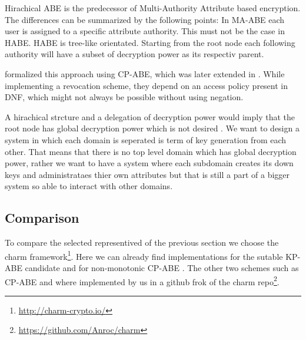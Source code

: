 Hirachical ABE is the predecessor of Multi-Authority Attribute based encryption. The differences can be summarized by the following points: In MA-ABE each user is assigned to a specific attribute authority. This must not be the case in HABE. HABE is tree-like orientated. Starting from the root node each following authority will have a subset of decryption power as its respectiv parent. 

\cite{Wang:2010:HAE:1866307.1866414} formalized this approach using CP-ABE, which was later extended in \cite{wang2011hierarchical}. While implementing a revocation scheme, they depend on an access policy present in DNF, which might not always be possible without using negation. 

A hirachical strcture and a delegation of decryption power would imply that the root node has global decryption power which is not desired . We want to design a system in which each domain is seperated is term of key generation from each other. That means that there is no top level domain which has global decryption power, rather we want to have a system where each subdomain creates its down keys and administrataes thier own attributes but that is still a part of a bigger system so able to interact with other domains.  



\subsection{Comparison}
To compare the selected representived of the previous section we choose the charm framework\footnote{\url{http://charm-crypto.io/}}. Here we can already find implementations for the sutable KP-ABE candidate \cite{lewko2010revocation} and for non-monotonic CP-ABE \cite{10.1007/978-3-642-54631-0_16}. The other two schemes such as CP-ABE \cite{liu2016practical} and \cite{wang2011hierarchical} where implemented by us in a github frok of the charm repo\footnote{\url{https://github.com/Anroc/charm}}. 

